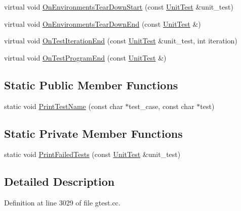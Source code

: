 \begin{DoxyCompactItemize}
\item 
virtual void \hyperlink{classtesting_1_1internal_1_1PrettyUnitTestResultPrinter_afea9dc849c92fdbc1d8505f4c74ffc1a}{On\+Environments\+Tear\+Down\+Start} (const \hyperlink{classtesting_1_1UnitTest}{Unit\+Test} \&unit\+\_\+test)
\item 
virtual void \hyperlink{classtesting_1_1internal_1_1PrettyUnitTestResultPrinter_ab23094ef3b714778b2f742d39818c280}{On\+Environments\+Tear\+Down\+End} (const \hyperlink{classtesting_1_1UnitTest}{Unit\+Test} \&)
\item 
virtual void \hyperlink{classtesting_1_1internal_1_1PrettyUnitTestResultPrinter_ac29b30216023baddda04ef5889f484ff}{On\+Test\+Iteration\+End} (const \hyperlink{classtesting_1_1UnitTest}{Unit\+Test} \&unit\+\_\+test, int iteration)
\item 
virtual void \hyperlink{classtesting_1_1internal_1_1PrettyUnitTestResultPrinter_a8c92c062889abdb940b04ffe113f5980}{On\+Test\+Program\+End} (const \hyperlink{classtesting_1_1UnitTest}{Unit\+Test} \&)
\end{DoxyCompactItemize}
\subsection*{Static Public Member Functions}
\begin{DoxyCompactItemize}
\item 
static void \hyperlink{classtesting_1_1internal_1_1PrettyUnitTestResultPrinter_a5b60a9aed1db02837b11450f6e8d0f71}{Print\+Test\+Name} (const char $\ast$test\+\_\+case, const char $\ast$test)
\end{DoxyCompactItemize}
\subsection*{Static Private Member Functions}
\begin{DoxyCompactItemize}
\item 
static void \hyperlink{classtesting_1_1internal_1_1PrettyUnitTestResultPrinter_aca5a9dc08998948e293b307d931b3f86}{Print\+Failed\+Tests} (const \hyperlink{classtesting_1_1UnitTest}{Unit\+Test} \&unit\+\_\+test)
\end{DoxyCompactItemize}


\subsection{Detailed Description}


Definition at line 3029 of file gtest.\+cc.



